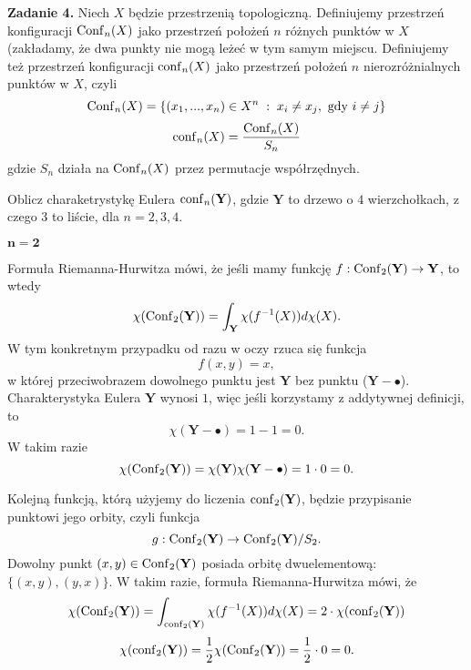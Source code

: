 \textbf{\large\color{orange}Zadanie 4.} Niech $X$ będzie przestrzenią topologiczną. Definiujemy przestrzeń konfiguracji $\operatorname{Conf}_n(X)$ jako przestrzeń położeń $n$ różnych punktów w $X$ (zakładamy, że dwa punkty nie mogą leżeć w tym samym miejscu. Definiujemy też przestrzeń konfiguracji $\operatorname{conf}_n(X)$ jako przestrzeń położeń $n$ nierozróżnialnych punktów w $X$, czyli
$$\operatorname{Conf}_n(X)=\{(x_1,...,x_n)\in X^n\;:\;x_i\neq x_j, \text{ gdy }i\neq j\}$$
$$\operatorname{conf}_n(X)=\frac{\operatorname{Conf}_n(X)}{S_n}$$
gdzie $S_n$ działa na $\operatorname{Conf}_n(X)$ przez permutacje współrzędnych.

Oblicz charaketrystykę Eulera $\operatorname{conf}_n(\mathbf{Y})$, gdzie $\mathbf{Y}$ to drzewo o $4$ wierzchołkach, z czego $3$ to liście, dla $n=2,3,4$.

\dotfill

\textbf{$\mathbf{n=2}$}


Formuła Riemanna-Hurwitza mówi, że jeśli mamy funkcję $f:\operatorname{Conf}_2(\mathbf{Y})\to \mathbf{Y}$, to wtedy
$$\chi(\operatorname{Conf}_2(\mathbf{Y}))=\int_{\mathbf{Y}}\chi(f^{-1}(X))d\chi(X).$$
W tym konkretnym przypadku od razu w oczy rzuca się funkcja
$$f(x, y)=x,$$
w której przeciwobrazem dowolnego punktu jest $\mathbf{Y}$ bez punktu ($\mathbf{Y}-\bullet$). Charakterystyka Eulera $\mathbf{Y}$ wynosi $1$, więc jeśli korzystamy z addytywnej definicji, to 
$$\chi(\mathbf{Y}-\bullet)=1-1=0.$$
W takim razie 
$$\chi(\operatorname{Conf}_2(\mathbf{Y}))=\chi(\mathbf{Y})\chi(\mathbf{Y}-\bullet)=1\cdot 0=0.$$


Kolejną funkcją, którą użyjemy do liczenia $\operatorname{conf}_2(\mathbf{Y})$, będzie przypisanie punktowi jego orbity, czyli funkcja
$$g:\operatorname{Conf}_2(\mathbf{Y})\to \operatorname{Conf}_2(\mathbf{Y})/S_2.$$
Dowolny punkt $(x, y)\in \operatorname{Conf}_2(\mathbf{Y})$ posiada orbitę dwuelementową: $\{(x, y), (y, x)\}$. W takim razie, formuła Riemanna-Hurwitza mówi, że
$$\chi(\operatorname{Conf}_2(\mathbf{Y}))=\int_{\operatorname{conf}_2(\mathbf{Y})}\chi(f^{-1}(X))d\chi(X)=2\cdot\chi(\operatorname{conf}_2(\mathbf{Y}))$$
$$\chi(\operatorname{conf}_2(\mathbf{Y}))=\frac{1}{2}\chi(\operatorname{Conf}_2(\mathbf{Y}))=\frac{1}{2}\cdot 0=0.$$


